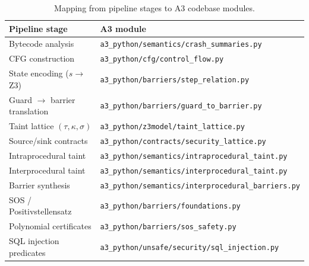 \documentclass[11pt,a4paper]{article}
\theoremstyle{plain}
\theoremstyle{definition}
\theoremstyle{remark}
\begin{document}
\begin{table}[ht]
\centering
\renewcommand{\arraystretch}{1.2}
\begin{tabular}{@{}ll@{}}
\toprule
\textbf{Pipeline stage} & \textbf{A3 module} \\
\midrule
Bytecode analysis & \texttt{a3\_python/semantics/crash\_summaries.py} \\
CFG construction & \texttt{a3\_python/cfg/control\_flow.py} \\
State encoding ($s \to$ Z3) & \texttt{a3\_python/barriers/step\_relation.py} \\
Guard $\to$ barrier translation & \texttt{a3\_python/barriers/guard\_to\_barrier.py} \\
Taint lattice $(\tau,\kappa,\sigma)$ & \texttt{a3\_python/z3model/taint\_lattice.py} \\
Source/sink contracts & \texttt{a3\_python/contracts/security\_lattice.py} \\
Intraprocedural taint & \texttt{a3\_python/semantics/intraprocedural\_taint.py} \\
Interprocedural taint & \texttt{a3\_python/semantics/interprocedural\_taint.py} \\
Barrier synthesis & \texttt{a3\_python/semantics/interprocedural\_barriers.py} \\
SOS / Positivstellensatz & \texttt{a3\_python/barriers/foundations.py} \\
Polynomial certificates & \texttt{a3\_python/barriers/sos\_safety.py} \\
SQL injection predicates & \texttt{a3\_python/unsafe/security/sql\_injection.py} \\
\bottomrule
\end{tabular}
\caption{Mapping from pipeline stages to A3 codebase modules.}
\label{tab:codebase-map}
\end{table}
\end{document}
